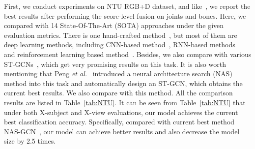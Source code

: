 \documentclass[letterpaper]{article} \usepackage{aaai19}  \usepackage{times}  \usepackage{helvet} \usepackage{courier}  \usepackage[hyphens]{url}  \usepackage{graphicx} \urlstyle{rm} \def\UrlFont{\rm}  \usepackage{graphicx}  \frenchspacing  \setlength{\pdfpagewidth}{8.5in}  \setlength{\pdfpageheight}{11in}
\def\etal{\emph{et al.}}
\begin{document}
First, we conduct experiments on NTU RGB+D dataset, and like~\cite{shi2019two,peng2020learning}, we report the best results after performing the score-level fusion on joints and bones. Here, we compared with 14 State-Of-The-Art (SOTA) approaches under the given evaluation metrics. There is one hand-crafted method~\cite{hu2015jointly}, but most of them are deep learning methods, including CNN-based method~\cite{kim2017interpretable}, RNN-based methods~\cite{shahroudy2016ntu,song2017end,zhang2017view,si2018skeleton} and reinforcement learning based method~\cite{tang2018deep}. Besides, we also compare with various ST-GCNs~\cite{li2018spatio,yan2018stgan,li2019spatio,gao2019optimized,li2019actional,shi2019two,peng2020learning}, which get very promising results on this task. It is also worth mentioning that Peng \etal~\cite{peng2020learning} introduced a neural architecture search (NAS) method into this task and automatically design an ST-GCN, which obtains the current best results.  We also compare with this method. All the comparison results are listed in Table~\ref{tab:NTU}. It can be seen from Table~\ref{tab:NTU} that under both X-subject and X-view evaluations, our model achieves the current best classification accuracy. Specifically, compared with current best method NAS-GCN~\cite{peng2020learning}, our model can achieve better results and also decrease the model size by 2.5 times. 
\end{document}
